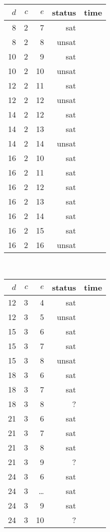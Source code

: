 \begin{tabular}{rrrrr}  %
$d$ & $c$ & $e$ & status & time \\
\midrule
 8 & 2 &  7 &   sat &  \\
 8 & 2 &  8 & unsat &  \\ %
10 & 2 &  9 &   sat &  \\
10 & 2 & 10 & unsat &  \\ %
12 & 2 & 11 &   sat &  \\
12 & 2 & 12 & unsat &  \\ %
14 & 2 & 12 &   sat &  \\
14 & 2 & 13 &   sat &  \\
14 & 2 & 14 & unsat &  \\ %
16 & 2 & 10 &   sat &  \\
16 & 2 & 11 &   sat &  \\
16 & 2 & 12 &   sat &  \\
16 & 2 & 13 &   sat &  \\
16 & 2 & 14 &   sat &  \\
16 & 2 & 15 &   sat &  \\
16 & 2 & 16 & unsat &  \\ %
\end{tabular}
~~
\begin{tabular}{rrrrr}
$d$ & $c$ & $e$ & status & time \\
\midrule
12 & 3 &  4 &   sat &  \\
12 & 3 &  5 & unsat &  \\ %
15 & 3 &  6 &   sat &  \\
15 & 3 &  7 &   sat &  \\
15 & 3 &  8 & unsat &  \\ %
18 & 3 &  6 &   sat &  \\
18 & 3 &  7 &   sat &  \\
18 & 3 &  8 &     ? &  \\
21 & 3 &  6 &   sat &  \\
21 & 3 &  7 &   sat &  \\
21 & 3 &  8 &   sat &  \\
21 & 3 &  9 &     ? &  \\
24 & 3 &  6 &   sat &  \\
24 & 3 & \dots& sat &  \\
24 & 3 &  9 &   sat &  \\
24 & 3 & 10 &     ? &  \\
\end{tabular}
